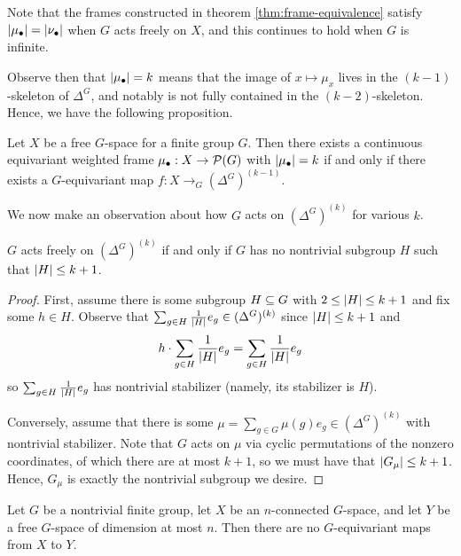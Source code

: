 Note that the frames constructed in theorem \ref{thm:frame-equivalence} satisfy $\left| \mu_\bullet \right| = \left| \nu_\bullet \right|$ when $G$ acts freely on $X$, and this continues to hold when $G$ is infinite.


Observe then that $\left| \mu_\bullet \right| = k$ means that the image of $x \mapsto \mu_x$ lives in the $(k-1)$-skeleton of $\Delta^G$, and notably is not fully contained in the $(k-2)$-skeleton.
Hence, we have the following proposition.

\begin{proposition}\label{prop:equi-frame-iff-equi-map}
    Let $X$ be a free $G$-space for a finite group $G$.
    Then there exists a continuous equivariant weighted frame $\mu_\bullet : X \to \mathcal{P}(G)$ with $\left| \mu_\bullet \right| = k$ if and only if there exists a $G$-equivariant map $f : X \to_G (\Delta^G)^{(k-1)}$.
\end{proposition}


We now make an observation about how $G$ acts on $(\Delta^G)^{(k)}$ for various $k$.


\begin{proposition}\label{prop:free-on-simplex-skeleton-iff-no-small-subgroups}
    $G$ acts freely on $(\Delta^G)^{(k)}$ if and only if $G$ has no nontrivial subgroup $H$ such that $\left| H \right| \leq k+1$.
    \begin{proof}
        First, assume there is some subgroup $H \subseteq G$ with $2 \leq \left| H \right| \leq k+1$ and fix some $h \in H$.
        Observe that $\sum_{g \in H} \frac{1}{\left| H \right|} e_{g} \in (\Delta^G)^{(k)}$ since $\left| H \right| \leq k+1$ and
        \[
            h \cdot \sum_{g \in H} \frac{1}{\left| H \right|} e_{g}
            = \sum_{g \in H} \frac{1}{\left| H \right|} e_{g}
        \]
        so $\sum_{g \in H} \frac{1}{\left| H \right|} e_{g}$ has nontrivial stabilizer (namely, its stabilizer is $H$).
        
        Conversely, assume that there is some $\mu = \sum_{g \in G} \mu(g) e_g \in (\Delta^G)^{(k)}$ with nontrivial stabilizer.
        Note that $G$ acts on $\mu$ via cyclic permutations of the nonzero coordinates, of which there are at most $k+1$, so we must have that $\left| G_\mu \right| \leq k+1$.
        Hence, $G_\mu$ is exactly the nontrivial subgroup we desire.
    \end{proof}
\end{proposition}


\begin{theorem}\label{thm:dold}
    Let $G$ be a nontrivial finite group, let $X$ be an $n$-connected $G$-space, and let $Y$ be a free $G$-space of dimension at most $n$.
    Then there are no $G$-equivariant maps from $X$ to $Y$.
\end{theorem}


